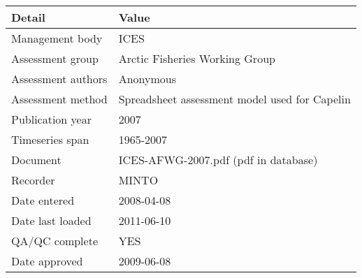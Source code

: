 \begin{table}[htb]
\centering
\begin{tabular}{lp{7cm}}
\toprule
Detail & Value \\
\midrule
Management body    & ICES                                          \\
Assessment group   & Arctic Fisheries Working Group                \\
Assessment authors & Anonymous                                     \\
Assessment method  & Spreadsheet assessment model used for Capelin \\
Publication year   & 2007                                          \\
Timeseries span    & 1965-2007                                     \\
Document           & ICES-AFWG-2007.pdf (pdf in database)          \\
Recorder           & MINTO                                         \\
Date entered       & 2008-04-08                                    \\
Date last loaded   & 2011-06-10                                    \\
QA/QC complete     & YES                                           \\
Date approved      & 2009-06-08                                    \\
\bottomrule
\end{tabular}
\label{tab:assessdet}
\end{table}
